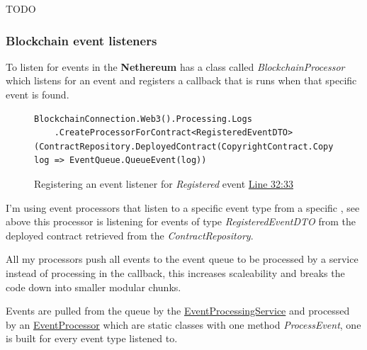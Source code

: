 TODO

\subsubsection{Blockchain event listeners}
\label{sec:blockchain-event-listeners}

To listen for events in the  \textbf{Nethereum} has a class called \textit{BlockchainProcessor} which listens for an event and registers a callback that is runs when that specific event is found.

\begin{figure}[H]
\caption{Registering an event listener for \textit{Registered} event \href{https://github.com/MrHarrisonBarker/CRPL/blob/main/CRPL.Web/Services/Background/BlockchainEventListener.cs}{Line 32:33}}
\centering
\begin{lstlisting}[language=CSharp]
BlockchainConnection.Web3().Processing.Logs
	.CreateProcessorForContract<RegisteredEventDTO>(ContractRepository.DeployedContract(CopyrightContract.Copyright).Address, log => EventQueue.QueueEvent(log))
\end{lstlisting}
\end{figure}

I'm using event processors that listen to a specific event type from a specific , see above this processor is listening for events of type \textit{RegisteredEventDTO} from the deployed contract retrieved from the \textit{ContractRepository}.

All my processors push all events to the event queue to be processed by a service instead of processing in the callback, this increases scaleability and breaks the code down into smaller modular chunks.

Events are pulled from the queue by the \href{https://github.com/MrHarrisonBarker/CRPL/blob/main/CRPL.Web/Services/Background/EventProcessingService.cs}{EventProcessingService} and processed by an \href{https://github.com/MrHarrisonBarker/CRPL/tree/main/CRPL.Web/Core/EventProcessors}{EventProcessor} which are static classes with one method \textit{ProcessEvent}, one is built for every event type listened to. 

